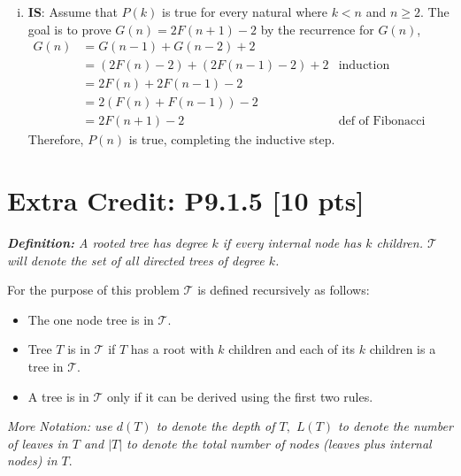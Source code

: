 \documentclass[12pt]{article}
\begin{document}
\begin{enumerate}[(a)]
\begin{enumerate}[(i)]
				\item \textbf{IS}: Assume that $P(k)$ is true for every natural where $k<
					n$ and $n\geq 2$. The goal is to prove $G(n)=2F(n+1)-2$ by the
					recurrence for $G(n)$,
					\begin{align*}
						G(n) & = G(n-1)+G(n-2)+2                                 \\
						     & = \left(2F(n)-2\right) +\left(2F(n-1)-2\right)+2 & \text{induction hypothesis}         \\
						     & = 2F(n)+2F(n-1)-2                                 \\
						     & = 2\left(F(n)+F(n-1)\right)-2                     \\
						     & = 2F(n+1)-2                                      & \text{def of Fibonacci recursively}
					\end{align*}
					Therefore, $P(n)$ is true, completing the inductive step.
			\end{enumerate}
	\end{enumerate}

	\newpage

	\section*{\textbf{Extra Credit: P9.1.5} [10 pts]}

	{\em {\bf Definition:} A rooted tree has degree $k$ if every internal node has $k$ children. ${\mathcal{T}}$ will denote the set of all directed trees of degree $k$. }

	\medskip

	For the purpose of this problem $\mathcal{T}$ is defined recursively as
	follows:
	\begin{itemize}
		\item The one node tree is in $\mathcal{T}.$

		\item Tree $T$ is in $\mathcal{T}$ if $T$ has a root with $k$ children and each
			of its $k$ children is a tree in $\mathcal{T}.$

		\item A tree is in $\mathcal{T}$ only if it can be derived using the first two
			rules.
	\end{itemize}

	{\em More Notation: use $d(T)$ to denote the depth of $T,$ $L(T)$ to denote the number of leaves in $T$ and $|T|$ to denote the total number of nodes (leaves plus internal nodes) in $T.$ }
\end{document}
